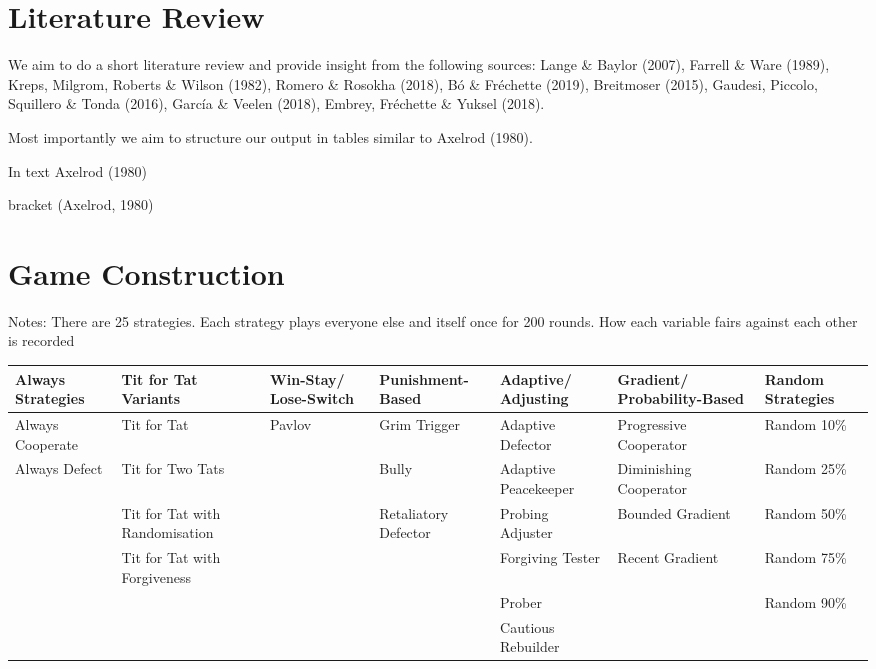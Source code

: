 \documentclass[11pt,preprint]{elsarticle}
\let\origtable\table
\let\endorigtable\endtable
\renewenvironment{table}[1][2] {
    \expandafter\origtable\expandafter[H]
} {
    \endorigtable
}
\numberwithin{equation}{section}
\numberwithin{figure}{section}
\numberwithin{table}{section}
\begin{document}
\section{\texorpdfstring{Literature
Review\label{litreview}}{Literature Review}}\label{literature-review}

We aim to do a short literature review and provide insight from the
following sources: Lange \& Baylor (2007), Farrell \& Ware (1989),
Kreps, Milgrom, Roberts \& Wilson (1982), Romero \& Rosokha (2018), Bó
\& Fréchette (2019), Breitmoser (2015), Gaudesi, Piccolo, Squillero \&
Tonda (2016), García \& Veelen (2018), Embrey, Fréchette \& Yuksel
(2018).

Most importantly we aim to structure our output in tables similar to
Axelrod (1980).

In text Axelrod (1980)

bracket (Axelrod, 1980)

\section{Game Construction}\label{game-construction}

Notes: There are 25 strategies. Each strategy plays everyone else and
itself once for 200 rounds. How each variable fairs against each other
is recorded

\renewcommand{\arraystretch}{1.2} %
\begin{table}[ht]
\centering
\tiny %
\begin{tabular}{|>{\centering\arraybackslash}p{2cm}|>{\centering\arraybackslash}p{2cm}|>{\centering\arraybackslash}p{2cm}|>{\centering\arraybackslash}p{2cm}|>{\centering\arraybackslash}p{2cm}|>{\centering\arraybackslash}p{2cm}|>{\centering\arraybackslash}p{2cm}|}
\hline
\textbf{Always Strategies} & \textbf{Tit for Tat Variants} & \textbf{Win-Stay/ Lose-Switch} & \textbf{Punishment-Based} & \textbf{Adaptive/ Adjusting} & \textbf{Gradient/ Probability-Based} & \textbf{Random Strategies} \\
\hline
Always Cooperate & Tit for Tat & Pavlov & Grim Trigger & Adaptive Defector & Progressive Cooperator & Random 10\% \\
Always Defect & Tit for Two Tats & & Bully & Adaptive Peacekeeper & Diminishing Cooperator & Random 25\% \\
& Tit for Tat with Randomisation & & Retaliatory Defector & Probing Adjuster & Bounded Gradient & Random 50\% \\
& Tit for Tat with Forgiveness & & & Forgiving Tester & Recent Gradient & Random 75\% \\
& & & & Prober & & Random 90\% \\
& & & & Cautious Rebuilder & & \\
\hline
\end{tabular}
\caption{Categorisation of Strategy Types Used in the Prisoner's Dilemma Tournament}
\end{table}
\end{document}
